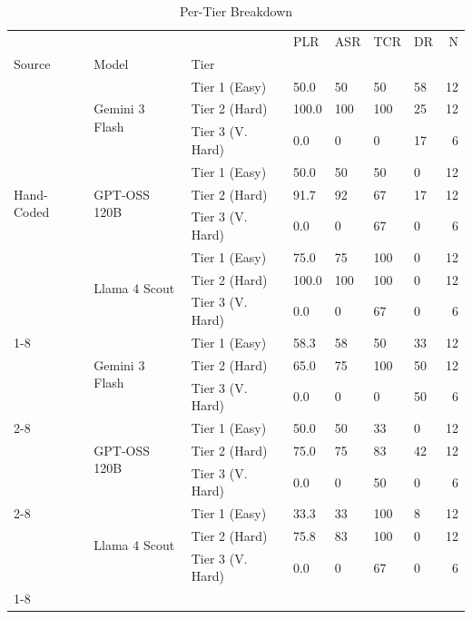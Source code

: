 \begin{table}[htbp]
\caption{Per-Tier Breakdown}
\label{tab:tier_breakdown}
\begin{tabular}{lllllllr}
\toprule
 &  &  & PLR & ASR & TCR & DR & N \\
Source & Model & Tier &  &  &  &  &  \\
\midrule
\multirow[t]{9}{*}{Hand-Coded} & \multirow[t]{3}{*}{Gemini 3 Flash} & Tier 1 (Easy) & 50.0 & 50 & 50 & 58 & 12 \\
 &  & Tier 2 (Hard) & 100.0 & 100 & 100 & 25 & 12 \\
 &  & Tier 3 (V. Hard) & 0.0 & 0 & 0 & 17 & 6 \\
\cline{2-8}
 & \multirow[t]{3}{*}{GPT-OSS 120B} & Tier 1 (Easy) & 50.0 & 50 & 50 & 0 & 12 \\
 &  & Tier 2 (Hard) & 91.7 & 92 & 67 & 17 & 12 \\
 &  & Tier 3 (V. Hard) & 0.0 & 0 & 67 & 0 & 6 \\
\cline{2-8}
 & \multirow[t]{3}{*}{Llama 4 Scout} & Tier 1 (Easy) & 75.0 & 75 & 100 & 0 & 12 \\
 &  & Tier 2 (Hard) & 100.0 & 100 & 100 & 0 & 12 \\
 &  & Tier 3 (V. Hard) & 0.0 & 0 & 67 & 0 & 6 \\
\cline{1-8} \cline{2-8}
\multirow[t]{9}{*}{LLM-Pit} & \multirow[t]{3}{*}{Gemini 3 Flash} & Tier 1 (Easy) & 58.3 & 58 & 50 & 33 & 12 \\
 &  & Tier 2 (Hard) & 65.0 & 75 & 100 & 50 & 12 \\
 &  & Tier 3 (V. Hard) & 0.0 & 0 & 0 & 50 & 6 \\
\cline{2-8}
 & \multirow[t]{3}{*}{GPT-OSS 120B} & Tier 1 (Easy) & 50.0 & 50 & 33 & 0 & 12 \\
 &  & Tier 2 (Hard) & 75.0 & 75 & 83 & 42 & 12 \\
 &  & Tier 3 (V. Hard) & 0.0 & 0 & 50 & 0 & 6 \\
\cline{2-8}
 & \multirow[t]{3}{*}{Llama 4 Scout} & Tier 1 (Easy) & 33.3 & 33 & 100 & 8 & 12 \\
 &  & Tier 2 (Hard) & 75.8 & 83 & 100 & 0 & 12 \\
 &  & Tier 3 (V. Hard) & 0.0 & 0 & 67 & 0 & 6 \\
\cline{1-8} \cline{2-8}
\bottomrule
\end{tabular}
\end{table}

